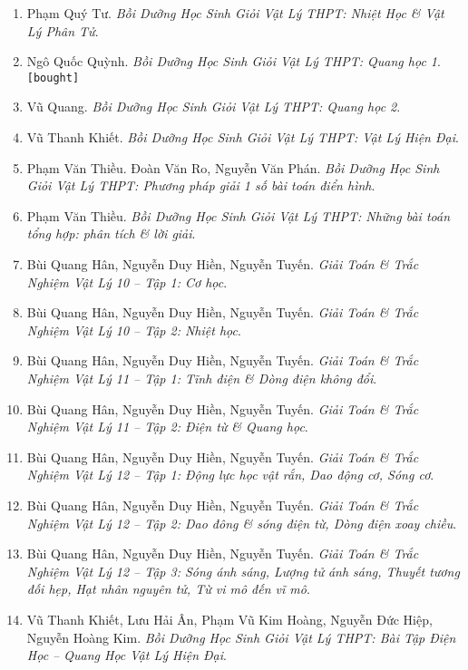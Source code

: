\documentclass{article}
\numberwithin{equation}{section}
\begin{document}
\begin{enumerate}
	\item Phạm Quý Tư. \textit{Bồi Dưỡng Học Sinh Giỏi Vật Lý THPT: Nhiệt Học \& Vật Lý Phân Tử}.
	\item Ngô Quốc Quỳnh. \textit{Bồi Dưỡng Học Sinh Giỏi Vật Lý THPT: Quang học 1}.\hfill\texttt{[bought]}
	\item Vũ Quang. \textit{Bồi Dưỡng Học Sinh Giỏi Vật Lý THPT: Quang học 2}.
	\item Vũ Thanh Khiết. \textit{Bồi Dưỡng Học Sinh Giỏi Vật Lý THPT: Vật Lý Hiện Đại}.
	\item Phạm Văn Thiều. Đoàn Văn Ro, Nguyễn Văn Phán. \textit{Bồi Dưỡng Học Sinh Giỏi Vật Lý THPT: Phương pháp giải 1 số bài toán điển hình}.
	\item Phạm Văn Thiều. \textit{Bồi Dưỡng Học Sinh Giỏi Vật Lý THPT: Những bài toán tổng hợp: phân tích \& lời giải}.
	\item Bùi Quang Hân, Nguyễn Duy Hiền, Nguyễn Tuyến. \textit{Giải Toán \& Trắc Nghiệm Vật Lý 10 -- Tập 1: Cơ học}.
	\item Bùi Quang Hân, Nguyễn Duy Hiền, Nguyễn Tuyến. \textit{Giải Toán \& Trắc Nghiệm Vật Lý 10 -- Tập 2: Nhiệt học}.
	\item Bùi Quang Hân, Nguyễn Duy Hiền, Nguyễn Tuyến. \textit{Giải Toán \& Trắc Nghiệm Vật Lý 11 -- Tập 1: Tĩnh điện \& Dòng điện không đổi}.
	\item Bùi Quang Hân, Nguyễn Duy Hiền, Nguyễn Tuyến. \textit{Giải Toán \& Trắc Nghiệm Vật Lý 11 -- Tập 2: Điện từ \& Quang học}.
	\item Bùi Quang Hân, Nguyễn Duy Hiền, Nguyễn Tuyến. \textit{Giải Toán \& Trắc Nghiệm Vật Lý 12 -- Tập 1: Động lực học vật rắn, Dao động cơ, Sóng cơ}.
	\item Bùi Quang Hân, Nguyễn Duy Hiền, Nguyễn Tuyến. \textit{Giải Toán \& Trắc Nghiệm Vật Lý 12 -- Tập 2: Dao đông \& sóng điện từ, Dòng điện xoay chiều}.
	\item Bùi Quang Hân, Nguyễn Duy Hiền, Nguyễn Tuyến. \textit{Giải Toán \& Trắc Nghiệm Vật Lý 12 -- Tập 3: Sóng ánh sáng, Lượng tử ánh sáng, Thuyết tương đối hẹp, Hạt nhân nguyên tử, Từ vi mô đến vĩ mô}.
	\item Vũ Thanh Khiết, Lưu Hải Ân, Phạm Vũ Kim Hoàng, Nguyễn Đức Hiệp, Nguyễn Hoàng Kim. \textit{Bồi Dưỡng Học Sinh Giỏi Vật Lý THPT: Bài Tập Điện Học -- Quang Học Vật Lý Hiện Đại}.
\end{enumerate}
\end{document}
